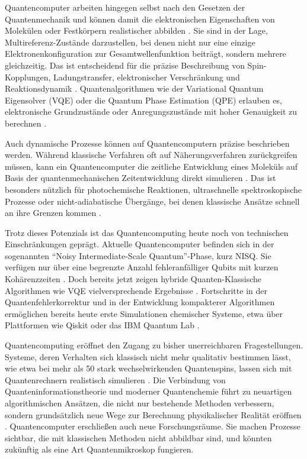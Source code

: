 {Quantencomputer arbeiten hingegen selbst nach den Gesetzen der Quantenmechanik und können damit die elektronischen Eigenschaften von Molekülen oder Festkörpern realistischer abbilden \cite{akromDevelopmentQuantumMachine2024}\cite{bauer_quantum_2020}. Sie sind in der Lage, Multireferenz-Zustände darzustellen, bei denen nicht nur eine einzige Elektronenkonfiguration zur Gesamtwellenfunktion beiträgt, sondern mehrere gleichzeitig. Das ist entscheidend für die präzise Beschreibung von Spin-Kopplungen, Ladungstransfer, elektronischer Verschränkung und Reaktionsdynamik \cite{akromDevelopmentQuantumMachine2024}. Quantenalgorithmen wie der Variational Quantum Eigensolver (VQE) oder die Quantum Phase Estimation (QPE) erlauben es, elektronische Grundzustände oder Anregungszustände mit hoher Genauigkeit zu berechnen \cite{weidman_quantum_2024}\cite{aspuru-guzik_simulated_2005}\cite{cao_quantum_2019}.

Auch dynamische Prozesse können auf Quantencomputern präzise beschrieben werden. Während klassische Verfahren oft auf Näherungsverfahren zurückgreifen müssen, kann ein Quantencomputer die zeitliche Entwicklung eines Moleküls auf Basis der quantenmechanischen Zeitentwicklung direkt simulieren \cite{cao_quantum_2019}. Das ist besonders nützlich für photochemische Reaktionen, ultraschnelle spektroskopische Prozesse oder nicht-adiabatische Übergänge, bei denen klassische Ansätze schnell an ihre Grenzen kommen \cite{weidman_quantum_2024}.

Trotz dieses Potenzials ist das Quantencomputing heute noch von technischen Einschränkungen geprägt. Aktuelle Quantencomputer befinden sich in der sogenannten ``Noisy Intermediate-Scale Quantum''-Phase, kurz NISQ. Sie verfügen nur über eine begrenzte Anzahl fehleranfälliger Qubits mit kurzen Kohärenzzeiten \cite{daley_practical_2022}. Doch bereits jetzt zeigen hybride Quanten-Klassische Algorithmen wie VQE vielversprechende Ergebnisse \cite{bauer_quantum_2020}\cite{cao_quantum_2019}. Fortschritte in der Quantenfehlerkorrektur und in der Entwicklung kompakterer Algorithmen ermöglichen bereits heute erste Simulationen chemischer Systeme, etwa über Plattformen wie Qiskit oder das IBM Quantum Lab \cite{liu_quantum_2020}.

Quantencomputing eröffnet den Zugang zu bisher unerreichbaren Fragestellungen. Systeme, deren Verhalten sich klassisch nicht mehr qualitativ bestimmen lässt, wie etwa bei mehr als 50 stark wechselwirkenden Quantenspins, lassen sich mit Quantenrechnern realistisch simulieren \cite{bauer_quantum_2020}. Die Verbindung von Quanteninformationstheorie und moderner Quantenchemie führt zu neuartigen algorithmischen Ansätzen, die nicht nur bestehende Methoden verbessern, sondern grundsätzlich neue Wege zur Berechnung physikalischer Realität eröffnen \cite{liu_quantum_2020}\cite{weidman_quantum_2024}. Quantencomputer erschließen auch neue Forschungsräume. Sie machen Prozesse sichtbar, die mit klassischen Methoden nicht abbildbar sind, und könnten zukünftig als eine Art Quantenmikroskop fungieren.
}

